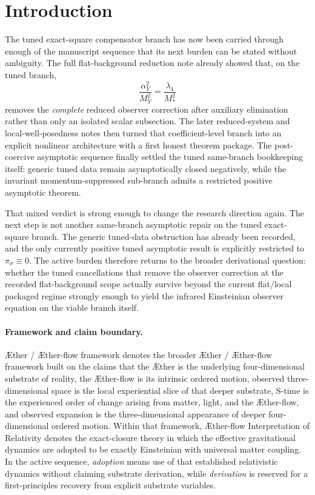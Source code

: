 \documentclass[11pt]{article}
\newcommand{\Aether}{\AE{}ther}
\newcommand{\Aflow}{\AE{}ther-flow}
\newcommand{\TheoryName}{\Aflow{} Interpretation of Relativity}
\newcommand{\TheoryProgram}{\Aether{} / \Aflow{} framework}
\begin{document}
\section{Introduction}

The tuned exact-square compensator branch has now been carried through enough of the manuscript sequence that its next burden can be stated without ambiguity. The full flat-background reduction note already showed that, on the tuned branch,
\[
\frac{\alpha_Y^2}{M_Y^2}=\frac{\lambda_4}{M_*^2}
\]
removes the \emph{complete} reduced observer correction after auxiliary elimination rather than only an isolated scalar subsection. The later reduced-system and local-well-posedness notes then turned that coefficient-level branch into an explicit nonlinear architecture with a first honest theorem package. The post-coercive asymptotic sequence finally settled the tuned same-branch bookkeeping itself: generic tuned data remain asymptotically closed negatively, while the invariant momentum-suppressed sub-branch admits a restricted positive asymptotic theorem.

That mixed verdict is strong enough to change the research direction again. The next step is not another same-branch asymptotic repair on the tuned exact-square branch. The generic tuned-data obstruction has already been recorded, and the only currently positive tuned asymptotic result is explicitly restricted to \(\pi_\sigma\equiv 0\). The active burden therefore returns to the broader derivational question: whether the tuned cancellations that remove the observer correction at the recorded flat-background scope actually survive beyond the current flat/local packaged regime strongly enough to yield the infrared Einsteinian observer equation on the viable branch itself.

\paragraph{Framework and claim boundary.}
\TheoryProgram{} denotes the broader \Aether{} / \Aflow{} framework built on the claims that the \Aether{} is the underlying four-dimensional substrate of reality, the \Aflow{} is its intrinsic ordered motion, observed three-dimensional space is the local experiential slice of that deeper substrate, S-time is the experienced order of change arising from matter, light, and the \Aflow{}, and observed expansion is the three-dimensional appearance of deeper four-dimensional ordered motion. Within that framework, \TheoryName{} denotes the exact-closure theory in which the effective gravitational dynamics are adopted to be exactly Einsteinian with universal matter coupling. In the active sequence, \emph{adoption} means use of that established relativistic dynamics without claiming substrate derivation, while \emph{derivation} is reserved for a first-principles recovery from explicit substrate variables.
\end{document}
